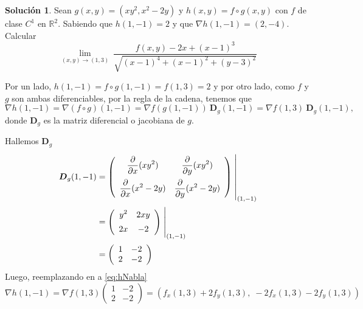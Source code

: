\documentclass[10pt, a4paper]{report}
\renewcommand{\Re}{\mathbb {R}}
\newcommand{\partialx}{\frac{\partial}{\partial x}}
\newcommand{\partialy}{\frac{\partial}{\partial y}}
\theoremstyle{definition} %
\newtheorem{solution}{Solución}
\begin{document}
\begin{solution}
    Sean $g(x,y)=(xy^2,x^2-2y)$ y $h(x,y)=f \circ g(x,y)$ con $f$ de clase $C^1$ en $\Re^2$. Sabiendo que $h(1,-1)=2$ y que $\nabla h(1,-1)=(2,-4)$. Calcular
    \[
        \lim_{(x,y)\to (1,3)} \ 
        \frac{f(x,y)-2x+(x-1)^3}{\sqrt{(x-1)^4+(x-1)^2+(y-3)^2}}       
    \]

 Por un lado,      $h(1,-1)= f\circ g (1,-1) =  f(1,3)=2$  y por otro lado,  como $f$ y $g$ son ambas diferenciables,  por la regla de la cadena,  tenemos que
    \begin{equation}
        \nabla h(1,-1)=\nabla (f\circ g)(1,-1)=\nabla f(g(1,-1)) \:\boldsymbol{D}_g(1,-1) = \nabla f (1,3) \:\boldsymbol{D}_g(1,-1),  \label{eq:hNabla}
    \end{equation}    donde $\boldsymbol{D}_g$ es la matriz diferencial o  jacobiana de $g$.

    
    \noindent  Hallemos $\boldsymbol{D}_g$
    \begin{align*}
        \boldsymbol{D}_g(1,-1) & =
        \left(\begin{array}{cc}
                      \displaystyle\partialx (xy^2)            & \displaystyle\partialy (xy^2)           \\[10pt]
                      \displaystyle\partialx  (x^2 -2y) & \displaystyle\partialy (x^2 -2y)
                  \end{array}\right)\left.\rule{0pt}{1.1cm}\right\rvert_{(1,-1)}             \\[2pt]
                              & =\left(\begin{array}{cc}
                                               \displaystyle y^2                 & \displaystyle 2xy              \\[5pt]
                                               \displaystyle   2x & \displaystyle -2
                                           \end{array}\right)\left.\rule{0pt}{0.7cm}\right\rvert_{(1,-1)} \\[2pt]
                              & =\left(\begin{array}{cc}
                                               1    & -2    \\
                                               2 & -2
                                           \end{array}\right)
    \end{align*}
    Luego, reemplazando en  a   \eqref{eq:hNabla}
    \[
        \nabla h(1,-1) = \nabla f(1,3)\left(\begin{array}{cc}
                1   & -2    \\
                2 & -2
            \end{array}\right) = \left(f_x(1,3) + 2f_y(1,3),\;-2f_x(1,3)-2f_y(1,3)\right)
    \]


\end{solution}
\end{document}
